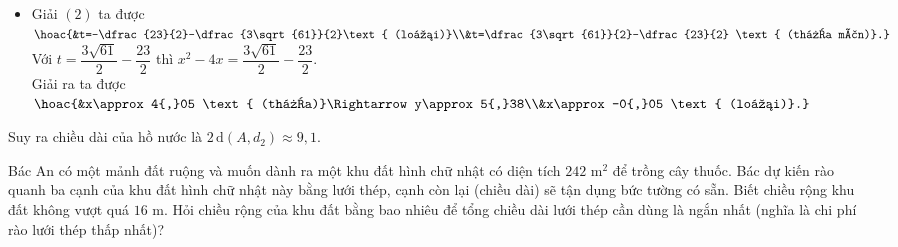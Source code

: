 \begin{ex}
{\begin{itemize}
			\item Giải $(2)$ ta được $\hoac{&t=-\dfrac{23}{2}-\dfrac{3\sqrt{61}}{2}\text{ (loại)}\\&t=\dfrac{3\sqrt{61}}{2}-\dfrac{23}{2} \text{ (thỏa mãn)}.}$\\
			Với $t=\dfrac{3\sqrt{61}}{2}-\dfrac{23}{2}$ thì $x^2-4x=\dfrac{3\sqrt{61}}{2}-\dfrac{23}{2}$.\\
			Giải ra ta được $\hoac{&x\approx4{,}05 \text{ (thỏa)}\Rightarrow y\approx5{,}38\\&x\approx -0{,}05 \text{ (loại)}.}$
		\end{itemize}
		Suy ra chiều dài của hồ nước là $2\mathrm{\,d}(A,d_2)\approx 9{,}1$.
	}
\end{ex}

\begin{ex}%
	Bác An có một mảnh đất ruộng và muốn dành ra một khu đất hình chữ nhật có diện tích $242$ m$^2$ để trồng cây thuốc. Bác dự kiến rào quanh ba cạnh của khu đất hình chữ nhật này bằng lưới thép, cạnh còn lại (chiều dài) sẽ tận dụng bức tường có sẵn. Biết chiều rộng khu đất không vượt quá $16$ m. Hỏi chiều rộng của khu đất bằng bao nhiêu để tổng chiều dài lưới thép cần dùng là ngắn nhất (nghĩa là chi phí rào lưới thép thấp nhất)?
	\loigiai{
		Gọi chiều rộng khu đất hình chữ nhật cần rào là $x$ (m), $0< x \le 16$.\\
		Diện tích khu đất này là $242$ m$^2$ nên chiều dài của khu đất là 
		$\dfrac{242}{x}$ (m)\\
		Tổng chiều dài lưới thép rào quanh khu đất hình chữ nhật là $2x+\dfrac{242}{x}$ (m).\\
		Xét hàm số $y=2x+\dfrac{242}{x}$, $x \in \left( 0; 16 \right]$.\\
		Ta có $y'=2-\dfrac{242}{x^2} = \dfrac{2x^2-242}{x^2}$ và $y'=0 \Leftrightarrow 2x^2-242=0 \Rightarrow x=11$ (do $x \in \left( 0; 16 \right]$).\\
		Ta có
		$\lim\limits_{x \to 0^+} y = \lim\limits_{x \to 0^+} \left( 2x + \dfrac{242}{x} \right) = +\infty$; $y(11)=44$; $y(16)=\dfrac{377}{8}$.\\
		Bảng biến thiên
		\begin{center}
			\begin{tikzpicture}
				\tkzTabInit[espcl=2.5,lgt=1.5]
				{$x$/0.7,$y'$/0.7,$y$/2.1}
				{$0$,$11$,$16$}
				\tkzTabLine{,-,0,+}
				\tkzTabVar{+/$+\infty$,-/$44$,+/$\dfrac{377}{8}$}
			\end{tikzpicture}
		\end{center}
		Dựa vào bảng biến thiên, chiều dài lưới thép ngắn nhất là $44$ m khi chiều rộng khu đất là $11$ m.\\
	}
\end{ex}

